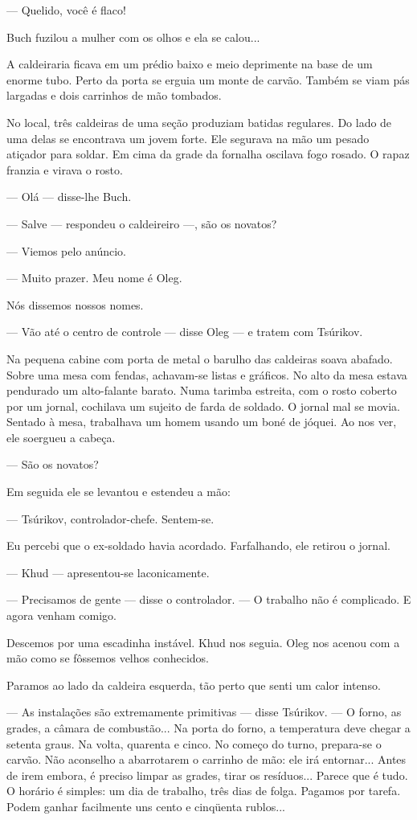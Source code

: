 --- Quelido, você é flaco!

Buch fuzilou a mulher com os olhos e ela se calou...

A caldeiraria ficava em um prédio baixo e meio deprimente na base de um
enorme tubo. Perto da porta se erguia um monte de carvão. Também se viam
pás largadas e dois carrinhos de mão tombados.

No local, três caldeiras de uma seção produziam batidas regulares. Do
lado de uma delas se encontrava um jovem forte. Ele segurava na mão um
pesado atiçador para soldar. Em cima da grade da fornalha oscilava fogo
rosado. O rapaz franzia e virava o rosto.

--- Olá --- disse-lhe Buch.

--- Salve --- respondeu o caldeireiro ---, são os novatos?

--- Viemos pelo anúncio.

--- Muito prazer. Meu nome é Oleg.

Nós dissemos nossos nomes.

--- Vão até o centro de controle --- disse Oleg --- e tratem com
Tsúrikov.

Na pequena cabine com porta de metal o barulho das caldeiras soava
abafado. Sobre uma mesa com fendas, achavam-se listas e gráficos. No
alto da mesa estava pendurado um alto-falante barato. Numa tarimba
estreita, com o rosto coberto por um jornal, cochilava um sujeito de
farda de soldado. O jornal mal se movia. Sentado à mesa, trabalhava um
homem usando um boné de jóquei. Ao nos ver, ele soergueu a cabeça.

--- São os novatos?

Em seguida ele se levantou e estendeu a mão:

--- Tsúrikov, controlador-chefe. Sentem-se.

Eu percebi que o ex-soldado havia acordado. Farfalhando, ele retirou o
jornal.

--- Khud --- apresentou-se laconicamente.

--- Precisamos de gente --- disse o controlador. --- O trabalho não é
complicado. E agora venham comigo.

Descemos por uma escadinha instável. Khud nos seguia. Oleg nos acenou
com a mão como se fôssemos velhos conhecidos.

Paramos ao lado da caldeira esquerda, tão perto que senti um calor
intenso.

--- As instalações são extremamente primitivas --- disse Tsúrikov. --- O
forno, as grades, a câmara de combustão... Na porta do forno, a
temperatura deve chegar a setenta graus. Na volta, quarenta e cinco. No
começo do turno, prepara-se o carvão. Não aconselho a abarrotarem o
carrinho de mão: ele irá entornar... Antes de irem embora, é preciso
limpar as grades, tirar os resíduos... Parece que é tudo. O horário é
simples: um dia de trabalho, três dias de folga. Pagamos por tarefa.
Podem ganhar facilmente uns cento e cinqüenta rublos...

